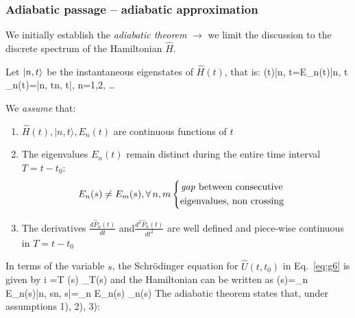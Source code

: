 \documentclass[12pt]{article}
\begin{document}
\subsubsection{Adiabatic passage -- adiabatic approximation}

We initially establish the \emph{adiabatic theorem}
$\rightarrow$ we limit the discussion to the discrete
spectrum of the Hamiltonian $\hat{H}$.

Let $\ket{n,t}$ be the instantaneous eigenstates of
$\hat{H}(t)$, that is:
\be
{}(t)|n, t\rangle=E_{n}(t)|n, t\rangle
\ee
%
\be
{}_{n}(t)=|n, t\rangle\langle n, t|, n=1,2, \ldots
\ee


We \emph{assume} that:
\begin{enumerate}
\item $\hat{H}(t),|n, t\rangle, E_{n}(t)$ are continuous functions of $t$
%
\item The eigenvalues $E_{n}(t)$ remain distinct
during the entire time interval $T=t-t_{0}$:
\[
E_{n}(s) \neq E_{m}(s), \forall\, n, m
\begin{cases}
\begin{gathered}
\text{\emph{gap} between consecutive}\\
\text{eigenvalues, non crossing}
\end{gathered}
\end{cases}
\]
%
\item The derivatives $\frac{d\hat{P}_n(t)}{dt}$ and$ \frac{d^2\hat{P}_n(t)}{dt^2}$ are well
defined and piece-wise continuous in $T=t-t_0$
\end{enumerate}
%
In terms of the variable $s$, the Schrödinger equation
for $\hat{U}\left(t, t_{0}\right)$ in Eq.~\eqref{eq:g6} is given by
\be
i \hbar {}=T (s) _{T}(s)
\label{eq:g20}
\ee
and the Hamiltonian can be written as
\be
{}(s)=\sum_{n} E_{n}(s)|n, s\rangle\langle n, s|=\sum_{n} E_{n}(s) _{n}(s)
\ee
The adiabatic theorem states that, under assumptions 1), 2), 3):
\be
{}
\ee

\end{document}
